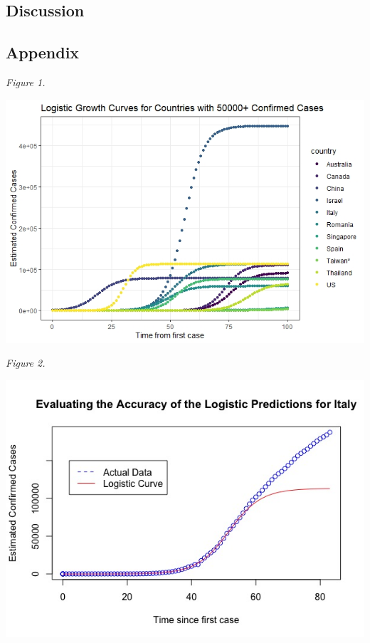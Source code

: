 \documentclass[]{article}
\begin{document}
\hypertarget{discussion}{%
\subsection{Discussion}\label{discussion}}

\hypertarget{appendix}{%
\subsection{Appendix}\label{appendix}}

\emph{Figure 1.}

\begin{center}\includegraphics{./growth_curves1} \end{center}

\emph{Figure 2.}

\begin{center}\includegraphics{./italy_predicted_cases} \end{center}
\end{document}
